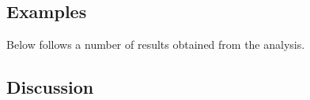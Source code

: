\documentclass[11pt,oneside,a4paper]{article}
\begin{document}
  \subsection*{Examples}
    Below follows a number of results obtained from the analysis.

\subsection*{Discussion}
\end{document}
